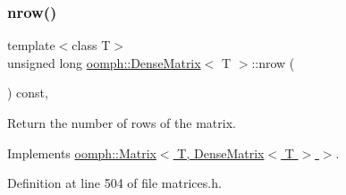 \mbox{\label{classoomph_1_1DenseMatrix_a1b425094510d833ffe91920747a0a962}} 
\subsubsection{\texorpdfstring{nrow()}{nrow()}}
{\footnotesize\ttfamily template$<$class T$>$ \\
unsigned long \hyperlink{classoomph_1_1DenseMatrix}{oomph\+::\+Dense\+Matrix}$<$ T $>$\+::nrow (\begin{DoxyParamCaption}{ }\end{DoxyParamCaption}) const\hspace{0.3cm}{\ttfamily [inline]}, {\ttfamily [virtual]}}



Return the number of rows of the matrix. 



Implements \hyperlink{classoomph_1_1Matrix_ac366ca5324d3e00e23d9800f3d5f4d5f}{oomph\+::\+Matrix$<$ T, Dense\+Matrix$<$ T $>$ $>$}.



Definition at line 504 of file matrices.\+h.



